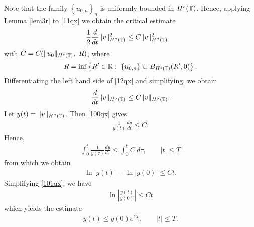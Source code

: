 Note that the family $\left\{ u_{0,n} \right\}_n$ is uniformly bounded in
$H^s(\mathbb{T})$. Hence, applying Lemma \ref{lem3r} to \eqref{11qx} we obtain the critical estimate 
\begin{equation}
	\begin{split}
		\label{12qx}
		\frac{1}{2}\frac{d}{dt} \|v\|_{H^{\sigma}(\mathbb{T})}^2
		& \le
	C \|v\|_{H^{\sigma}(\mathbb{T})}^2
\end{split}
\end{equation}
with $C = C(\|u_0\|_{H^s(\mathbb{T})}, \ R)$, where
\begin{equation}
	\label{r-def}
	R = \inf \left\{ R' \in \mathbb{R}:\ \{u_{0,n}\} \subset B_{H^s(\mathbb{T})}(R',0)
	\right\}.
\end{equation}
Differentiating the left hand side of \eqref{12qx} and simplifying, we
obtain
\begin{equation}
	\begin{split}
		\frac{d}{dt}\|v\|_{H^{\sigma}(\mathbb{T})} \le C \|v\|_{H^{\sigma}(\mathbb{T})}.
		\label{100qx}
	\end{split}
\end{equation}
Let $y(t) = \|v\|_{H^{\sigma}(\mathbb{T})}$. Then \eqref{100qx} gives
\begin{equation*}
	\begin{split}
		\frac{1}{y(t)}\frac{dy}{dt} \le C.
	\end{split}
\end{equation*}
Hence,
\begin{equation*}
	\begin{split}
		\int_0^t \frac{1}{y(\tau)} \frac{dy}{d \tau}
		\le \int_0^t C \ d \tau, \qquad |t| \le T
	\end{split}
\end{equation*}
from which we obtain
\begin{equation}
	\begin{split}
		\ln |y(t) | - \ln |y(0)| \le C t.
		\label{101qx}
	\end{split}
\end{equation}
Simplifying \eqref{101qx}, we have
\begin{equation*}
	\begin{split}
		\ln \left |\frac{y(t)}{y(0)} \right | \le C t
	\end{split}
\end{equation*}
which yields the estimate
\begin{equation*}
	\begin{split}
		y(t) \le y(0) e^{C t}, \qquad |t| \le T.
	\end{split}
\end{equation*}

